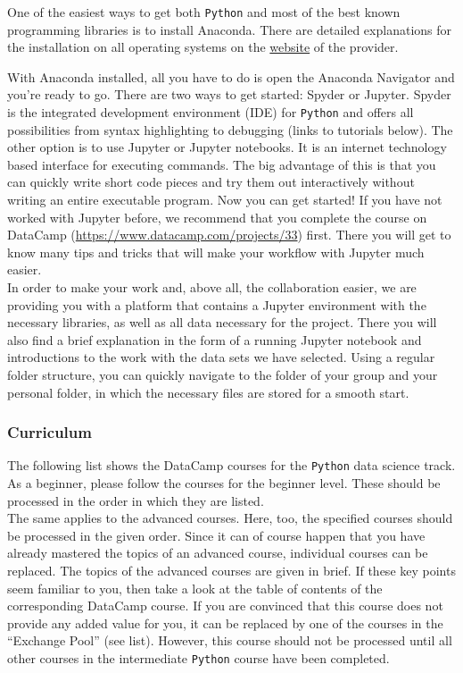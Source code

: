 \documentclass[
  11pt,
]{article}
\begin{document}
One of the easiest ways to get both \texttt{Python} and most of the best known programming libraries is to install Anaconda. There are detailed explanations for the installation on all operating systems on the \href{https://docs.anaconda.com/anaconda/install/}{website} of the provider.

With Anaconda installed, all you have to do is open the Anaconda Navigator and you're ready to go. There are two ways to get started: Spyder or Jupyter. Spyder is the integrated development environment (IDE) for \texttt{Python} and offers all possibilities from syntax highlighting to debugging (links to tutorials below). The other option is to use Jupyter or Jupyter notebooks. It is an internet technology based interface for executing commands. The big advantage of this is that you can quickly write short code pieces and try them out interactively without writing an entire executable program.
Now you can get started! If you have not worked with Jupyter before, we recommend that you complete the course on DataCamp (\url{https://www.datacamp.com/projects/33}) first. There you will get to know many tips and tricks that will make your workflow with Jupyter much easier.\\
In order to make your work and, above all, the collaboration easier, we are providing you with a platform that contains a Jupyter environment with the necessary libraries, as well as all data necessary for the project. There you will also find a brief explanation in the form of a running Jupyter notebook and introductions to the work with the data sets we have selected. Using a regular folder structure, you can quickly navigate to the folder of your group and your personal folder, in which the necessary files are stored for a smooth start.

\hypertarget{curriculum-1}{%
\subsubsection{Curriculum}\label{curriculum-1}}

The following list shows the DataCamp courses for the \texttt{Python} data science track. As a beginner, please follow the courses for the beginner level. These should be processed in the order in which they are listed.\\
The same applies to the advanced courses. Here, too, the specified courses should be processed in the given order. Since it can of course happen that you have already mastered the topics of an advanced course, individual courses can be replaced. The topics of the advanced courses are given in brief. If these key points seem familiar to you, then take a look at the table of contents of the corresponding DataCamp course.
If you are convinced that this course does not provide any added value for you, it can be replaced by one of the courses in the ``Exchange Pool'' (see list). However, this course should not be processed until all other courses in the intermediate \texttt{Python} course have been completed.
\end{document}
